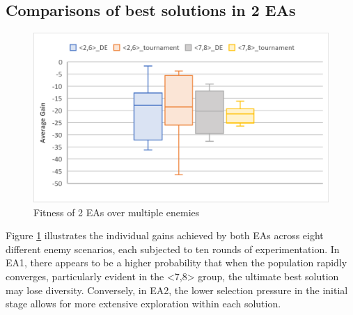 
\subsection{Comparisons of best solutions in 2 EAs}
\begin{figure}[htbp]
    \centering
    \includegraphics[width=0.9\columnwidth]{fig/gains.png}    
    \caption {Fitness of 2 EAs over multiple enemies}
    \label{fig:test}
\end{figure}
Figure \ref{fig:test} illustrates the individual gains achieved by both EAs across eight different enemy scenarios, each subjected to ten rounds of experimentation. In EA1, there appears to be a higher probability that when the population rapidly converges, particularly evident in the <7,8> group, the ultimate best solution may lose diversity. Conversely, in EA2, the lower selection pressure in the initial stage allows for more extensive exploration within each solution.

